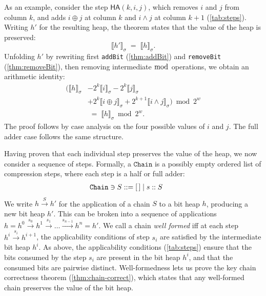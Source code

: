 \documentclass[conference]{IEEEtran}
\newcommand{\sem}[1]{\llbracket #1 \rrbracket}
\newcommand{\csem}[1]{\sem{#1}_{\sigma}}
\newcommand{\hsem}[1]{\llbracket #1 \rrbracket_{\sigma}}
\newcommand{\Chain}{\ensuremath{\texttt{Chain}}\xspace}
\newcommand{\HA}{\mathsf{HA}}
\theoremstyle{plain}
\theoremstyle{definition}
\begin{document}
As an example, consider the step $\HA(k,i,j)$, which removes $i$ and $j$ from column $k$,
and adds $i \oplus j$ at column $k$ and $i \wedge j$ at column $k{+}1$ (\autoref{tab:steps}).
Writing $h'$ for the resulting heap, the theorem states that the value of the heap is preserved:
\[
  \hsem{h'} \;=\; \hsem{h}.
\]
Unfolding $h'$ by rewriting first \texttt{addBit} (\autoref{thm:addBit}) and \texttt{removeBit} (\autoref{thm:removeBit}),
then removing intermediate $\bmod$ operations, we obtain an arithmetic identity:
\begin{equation*}
\begin{split}
  \bigl(\hsem{h}
    &- 2^{k}\csem{i}
     - 2^{k}\csem{j}\\
    &+ 2^{k}\csem{i \oplus j}
     + 2^{k+1}\csem{i \wedge j}\bigr) \bmod 2^{w}\\
  &\;=\; \hsem{h} \bmod 2^{w}.
\end{split}
\end{equation*}
The proof follows by case analysis on the four possible values of $i$ and $j$.
The full adder case follows the same structure.

Having proven that each individual step preserves the value of the heap, we now consider a
sequence of steps.
Formally, a \Chain is a possibly empty ordered list of compression steps, where each step is a half or full adder:
\[
\begin{array}{r@{\;}c@{\;}l@{\qquad}l}
\Chain \ni S &::=& [\,] \mid s :: S &
\end{array}
\]
We write $h \xrightarrow{S} h'$ for the application of a chain $S$ to a bit heap $h$, producing a new bit heap $h'$.
This can be broken into a sequence of applications $h = h^0 \xrightarrow{s_0} h^1 \xrightarrow{s_1} \dots \xrightarrow{s_{n-1}} h^n = h'$.
We call a chain \emph{well formed} iff at each step $h^i \xrightarrow{s_i} h^{i+1}$, the applicability conditions of step $s_{i}$
are satisfied by the intermediate bit heap $h^i$.
As above, the applicability conditions (\autoref{tab:steps}) ensure that the bits consumed by the step $s_i$ are 
present in the bit heap $h^i$,
and that the consumed bits are pairwise distinct.
Well-formedness lets us prove the key chain correctness theorem (\autoref{thm:chain-correct}),
which states that any well-formed chain preserves the value of the bit heap.
\end{document}
